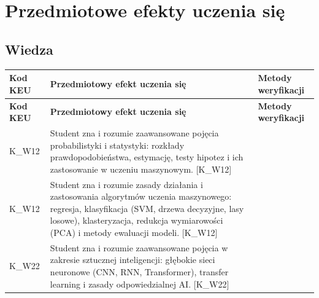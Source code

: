 \documentclass[12pt, a4paper]{article}
\newcommand{\thdrule}{\noalign{\global\setlength{\extrarowheight}{0pt}}}
\newcommand{\thdend}{\noalign{\global\setlength{\extrarowheight}{3pt}}}
\begin{document}
\section{Przedmiotowe efekty uczenia się}

\subsection*{Wiedza}
{\scriptsize
\begin{longtable}{m{1.6cm}m{9.0cm}m{4.2cm}}
\thdrule\toprule
\rowcolor{pjatkRed} {\color{white}\footnotesize\textbf{\vphantom{Ag}Kod KEU}} & {\color{white}\footnotesize\textbf{\vphantom{Ag}Przedmiotowy efekt uczenia się}} & {\color{white}\footnotesize\textbf{\vphantom{Ag}Metody weryfikacji}} \\
\midrule\thdend
\endfirsthead
\thdrule\toprule
\rowcolor{pjatkRed} {\color{white}\footnotesize\textbf{\vphantom{Ag}Kod KEU}} & {\color{white}\footnotesize\textbf{\vphantom{Ag}Przedmiotowy efekt uczenia się}} & {\color{white}\footnotesize\textbf{\vphantom{Ag}Metody weryfikacji}} \\
\midrule\thdend
\endhead
  \rowcolor{tableRowLight} K\_W12 & Student zna i rozumie zaawansowane pojęcia probabilistyki i statystyki: rozkłady prawdopodobieństwa, estymację, testy hipotez i ich zastosowanie w uczeniu maszynowym. {[}K\_W12{]} &  \\
  \rowcolor{tableRowAlt} K\_W12 & Student zna i rozumie zasady działania i zastosowania algorytmów uczenia maszynowego: regresja, klasyfikacja (SVM, drzewa decyzyjne, lasy losowe), klasteryzacja, redukcja wymiarowości (PCA) i metody ewaluacji modeli. {[}K\_W12{]} &  \\
  \rowcolor{tableRowLight} K\_W22 & Student zna i rozumie zaawansowane pojęcia w zakresie sztucznej inteligencji: głębokie sieci neuronowe (CNN, RNN, Transformer), transfer learning i zasady odpowiedzialnej AI. {[}K\_W22{]} &  \\
\bottomrule
\end{longtable}}
\end{document}
